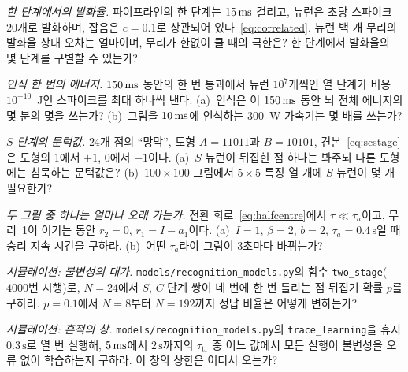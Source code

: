 \begin{exercise}[\lvlA]
\label{ex:12:1}
\emph{한 단계에서의 발화율.} 파이프라인의 한 단계는 $15\,\text{ms}$ 걸리고, 뉴런은 초당 스파이크 $20$개로 발화하며, 잡음은 $c=0.1$로 상관되어 있다~\eqref{eq:correlated}. 뉴런 백 개 무리의 발화율 상대 오차는 얼마이며, 무리가 한없이 클 때의 극한은? 한 단계에서 발화율의 몇 단계를 구별할 수 있는가?
\end{exercise}

\begin{exercise}[\lvlA]
\label{ex:12:2}
\emph{인식 한 번의 에너지.} $150\,\text{ms}$ 동안의 한 번 통과에서 뉴런 $10^7$개씩인 열 단계가 비용 $10^{-10}$~J인 스파이크를 최대 하나씩 낸다. (a)~인식은 이 $150\,\text{ms}$ 동안 뇌 전체 에너지의 몇 분의 몇을 쓰는가? (b)~그림을 $10\,\text{ms}$에 인식하는 $300$~W 가속기는 몇 배를 쓰는가?
\end{exercise}

\begin{exercise}[\lvlB]
\label{ex:12:3}
\emph{$S$ 단계의 문턱값.} $24$개 점의 “망막”, 도형 $A=11011$과 $B=10101$, 견본~\eqref{eq:scstage}은 도형의 1에서 $+1$, 0에서 $-1$이다. (a)~$S$ 뉴런이 뒤집힌 점 하나는 봐주되 다른 도형에는 침묵하는 문턱값은? (b)~$100\times100$ 그림에서 $5\times5$ 특징 열 개에 $S$ 뉴런이 몇 개 필요한가?
\end{exercise}

\begin{exercise}[\lvlB]
\label{ex:12:4}
\emph{두 그림 중 하나는 얼마나 오래 가는가.} 전환 회로~\eqref{eq:halfcentre}에서 $\tau\ll\tau_a$이고, 무리~1이 이기는 동안 $r_2=0$, $r_1=I-a_1$이다. (a)~$I=1$, $\beta=2$, $b=2$, $\tau_a=0.4\,\text{s}$일 때 승리 지속 시간을 구하라. (b)~어떤 $\tau_a$라야 그림이 3초마다 바뀌는가?
\end{exercise}

\begin{exercise}[\lvlB]
\label{ex:12:5}
\emph{시뮬레이션: 불변성의 대가.} \texttt{models/\allowbreak recognition\_models.py}의 함수 \texttt{two\_stage}($4000$번 시행)로, $N=24$에서 $S$, $C$ 단계 쌍이 네 번에 한 번 틀리는 점 뒤집기 확률 $p$를 구하라. $p=0.1$에서 $N=8$부터 $N=192$까지 정답 비율은 어떻게 변하는가?
\end{exercise}

\begin{exercise}[\lvlB]
\label{ex:12:6}
\emph{시뮬레이션: 흔적의 창.} \texttt{models/\allowbreak recognition\_\allowbreak models.py}의 \texttt{trace\_\allowbreak learning}을 휴지 $0.3\,\text{s}$로 열 번 실행해, $5\,\text{ms}$에서 $2\,\text{s}$까지의 $\tau_{\text{tr}}$ 중 어느 값에서 모든 실행이 불변성을 오류 없이 학습하는지 구하라. 이 창의 상한은 어디서 오는가?
\end{exercise}

